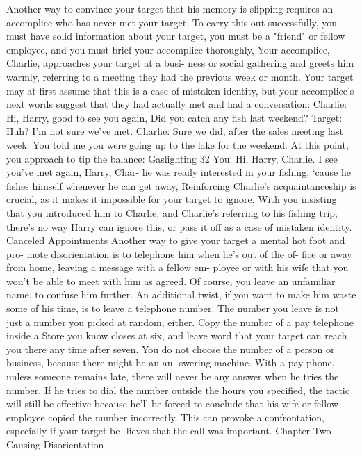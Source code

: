 \documentclass{book}
\begin{document}
Another way to convince your target that his memory is 
slipping requires an accomplice who has never met your target. 
To carry this out successfully, you must have solid information 
about your target, you must be a "friend" or fellow employee, 
and you must brief your accomplice thoroughly, 
Your accomplice, Charlie, approaches your target at a busi- 
ness or social gathering and greets him warmly, referring to a 
meeting they had the previous week or month. Your target may 
at first assume that this is a case of mistaken identity, but your 
accomplice's next words suggest that they had actually met and 
had a conversation: 
Charlie: Hi, Harry, good to see you again, Did you catch any 
fish last weekend? 
Target: Huh? I'm not sure we've met. 
Charlie: Sure we did, after the sales meeting last week. You 
told me you were going up to the lake for the weekend. 
At this point, you approach to tip the balance:    Gaslighting 
32 
You: Hi, Harry, Charlie. I see you've met again, Harry, Char- 
lie was reaily interested in your fishing, ‘cause he fishes 
himself whenever he can get away, 
Reinforcing Charlie's acquaintanceship is crucial, as it 
makes it impossible for your target to ignore. With you insisting 
that you introduced him to Charlie, and Charlie's referring to 
his fishing trip, there's no way Harry can ignore this, or pass it 
off as a case of mistaken identity. 
Canceled Appointments 
Another way to give your target a mental hot foot and pro- 
mote disorientation is to telephone him when he's out of the of- 
fice or away from home, leaving a message with a fellow em- 
ployee or with his wife that you won't be able to meet with him 
as agreed. Of course, you leave an unfamiliar name, to confuse 
him further. An additional twist, if you want to make him waste 
some of his time, is to leave a telephone number. 
The number you leave is not just a number you picked at 
random, either. Copy the number of a pay telephone inside a 
Store you know closes at six, and leave word that your target 
can reach you there any time after seven. You do not choose the 
number of a person or business, because there might be an an- 
swering machine. With a pay phone, unless someone remains 
late, there will never be any answer when he tries the number, If 
he tries to dial the number outside the hours you specified, the 
tactic will still be effective because he'll be forced to conclude 
that his wife or fellow employee copied the number incorrectly. 
This can provoke a confrontation, especially if your target be- 
lieves that the call was important. 
Chapter Two 
Causing Disorientation 
\end{document}

